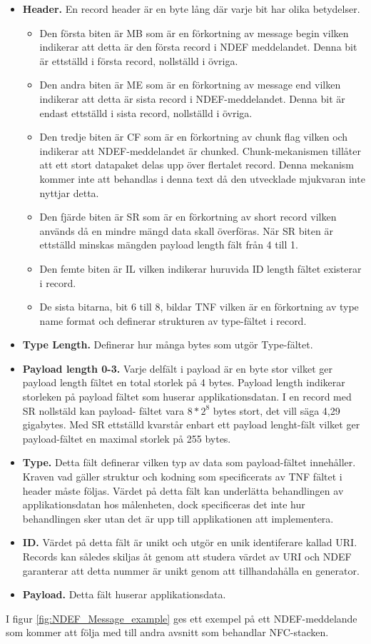 \documentclass[11pt]{article}
\begin{document}
\begin{itemize}
\item \textbf{Header.} En record header är en byte lång där varje bit har olika betydelser.
\begin{itemize}
\item Den första biten är MB som är en förkortning av message begin vilken indikerar att detta är den första record i NDEF meddelandet. Denna bit är ettställd i första record, nollställd i övriga.
\item Den andra biten är ME som är en förkortning av message end vilken indikerar att detta är sista record i NDEF-meddelandet. Denna bit är endast ettställd i sista record, nollställd i övriga.
\item Den tredje biten är CF som är en förkortning av chunk flag vilken och indikerar att NDEF-meddelandet är chunked. Chunk-mekanismen tillåter att ett stort datapaket delas upp över flertalet record. Denna mekanism kommer inte att behandlas i denna text då den utvecklade mjukvaran inte nyttjar detta.
\item Den fjärde biten är SR som är en förkortning av short record vilken används då en mindre mängd data skall överföras. När SR biten är ettställd minskas mängden payload length fält från 4 till 1.
\item Den femte biten är IL vilken indikerar huruvida ID length fältet existerar i record.
\item De sista bitarna, bit 6 till 8, bildar TNF vilken är en förkortning av type name format och definerar strukturen av type-fältet i record.
\end{itemize}
\item \textbf{Type Length.} Definerar hur många bytes som utgör Type-fältet.
\item \textbf{Payload length 0-3.} Varje delfält i payload är en byte stor vilket ger payload length fältet en total storlek på 4 bytes. Payload length indikerar storleken på payload fältet som huserar applikationsdatan. I en record med SR nollstäld kan payload- fältet vara  $8*2^8$ bytes stort, det vill säga 4,29 gigabytes. Med SR ettställd kvarstår enbart ett payload lenght-fält vilket ger  payload-fältet en maximal storlek på 255 bytes.
\item \textbf{Type.} Detta fält definerar vilken typ av data som payload-fältet innehåller. Kraven vad gäller struktur och kodning som specificerats av TNF fältet i header måste följas. Värdet på detta fält kan underlätta behandlingen av applikationsdatan hos målenheten, dock specificeras det inte hur behandlingen sker utan det är upp till applikationen att implementera.
\item \textbf{ID.} Värdet på detta fält är unikt och utgör en unik identiferare kallad URI. Records kan således skiljas åt genom att studera värdet av URI och NDEF garanterar att detta nummer är unikt genom att tillhandahålla en generator.
\item \textbf{Payload.} Detta fält huserar applikationsdata.
\end{itemize}
I figur \ref{fig:NDEF_Message_example} ges ett exempel på ett NDEF-meddelande som kommer att följa med till andra avsnitt som behandlar NFC-stacken.
\end{document}
